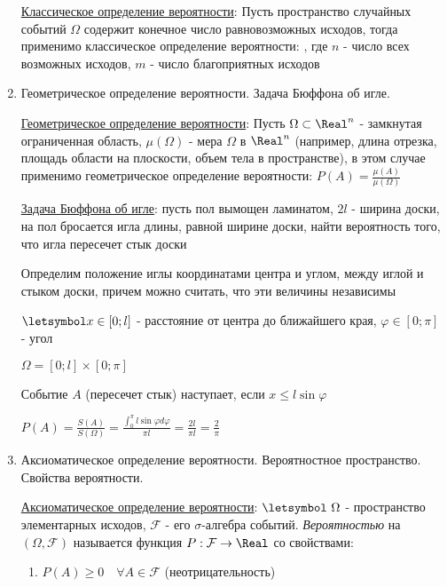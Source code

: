 \begin{enumerate}
    \hyperlink{classicdefinitionofprobability}{Классическое определение вероятности}: Пусть пространство случайных событий $\Omega$ содержит конечное число равновозможных исходов,
    тогда применимо классическое определение вероятности: , где $n$ - число всех возможных исходов, $m$ - число благоприятных исходов

    \item Геометрическое определение вероятности. Задача Бюффона об игле.

    \hyperlink{geometricdefinitionofprobability}{Геометрическое определение вероятности}: Пусть $\Omega \subset \Real^n$ - замкнутая ограниченная область,
    $\mu(\Omega)$ - мера $\Omega$ в $\Real^n$ (например, длина отрезка, площадь области на плоскости, объем тела в пространстве), в этом случае применимо геометрическое определение вероятности: $P(A) = \frac{\mu(A)}{\mu(\Omega)}$

    \hyperlink{buffonsproblem}{Задача Бюффона об игле}: пусть пол вымощен ламинатом, $2l$ - ширина доски, на пол бросается игла длины, равной ширине доски,
    найти вероятность того, что игла пересечет стык доски

    Определим положение иглы координатами центра и углом, между иглой и стыком доски, причем можно считать, что эти величины независимы

    $\letsymbol x \in [0; l]$ - расстояние от центра до ближайшего края, $\varphi \in [0; \pi]$ - угол

    $\Omega = [0; l] \times [0; \pi]$

    Событие $A$ (пересечет стык) наступает, если $x \leq l \sin \varphi$

    $P(A) = \frac{S(A)}{S(\Omega)} = \frac{\int_0^\pi l \sin \varphi d \varphi}{\pi l} = \frac{2l}{\pi l} = \frac{2}{\pi}$

    \item Аксиоматическое определение вероятности. Вероятностное пространство. Свойства вероятности.

    \hyperlink{axiomaticdefinitionofprobability}{Аксиоматическое определение вероятности}: $\letsymbol\ \Omega$ - пространство элементарных исходов, $\mathcal{F}$ - его $\sigma$-алгебра событий.
    \textit{Вероятностью} на $(\Omega, \mathcal{F})$ называется функция $P: \mathcal{F} \to \Real$ со свойствами:

    \begin{enumerate}
        \item $P(A) \geq 0 \quad \forall A \in \mathcal{F}$ (неотрицательность)


\end{enumerate}
\end{enumerate}
